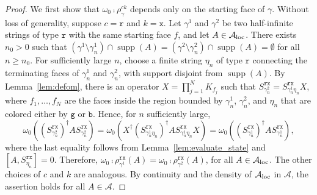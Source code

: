 \documentclass[a4paper,11pt]{article}
\theoremstyle{definition}
\theoremstyle{remark}
\theoremstyle{remark}
\begin{document}
\begin{proof}
    We first show that $\omega_0\comp\rho_\gamma^{ck}$ depends only on the starting face of $\gamma$. Without loss of generality, suppose $c=\mathtt{r}$ and $k=\mathtt{x}$. Let $\gamma^1$ and $\gamma^2$ be two half-infinite strings of type $\mathtt{r}$ with the same starting face $f$, and let $A\in\mathcal{A}_{\rm loc}$. There exists $n_0>0$ such that $(\gamma^1\setminus\gamma_n^1)\cap\operatorname{supp}(A) =  (\gamma^2\setminus\gamma_n^2)\cap\operatorname{supp}(A) = \emptyset$ for all $n\geq n_0$. For sufficiently large $n$, choose a finite string $\eta_n$ of type $\mathtt{r}$ connecting the terminating faces of $\gamma_n^1$ and $\gamma_n^2$, with support disjoint from $\operatorname{supp}(A)$. By Lemma~\ref{lem:defom}, there is an operator $X=\prod_{j=1}^N K_{f_j}$ such that $S_{\gamma_n^2}^{\mathtt{r}\mathtt{x}} = S_{\gamma_n^1\eta_n}^{\mathtt{r}\mathtt{x}}X$, where $f_1,\ldots,f_N$ are the faces inside the region bounded by $\gamma_n^1$, $\gamma_n^2$, and $\eta_n$ that are colored either by $\mathtt{g}$ or $\mathtt{b}$. Hence, for $n$ sufficiently large,
    \begin{equation*}
        \omega_0((S_{\gamma^2_n}^{\mathtt{r}\mathtt{x}})^\dagger AS_{\gamma^2_n}^{\mathtt{r}\mathtt{x}}) = \omega_0(X^\dagger(S_{\gamma^1_n\eta_n}^{\mathtt{r}\mathtt{x}})^\dagger AS_{\gamma^1_n\eta_n}^{\mathtt{r}\mathtt{x}}X) = \omega_0((S_{\gamma^1_n}^{\mathtt{r}\mathtt{x}})^\dagger AS_{\gamma^1_n}^{\mathtt{r}\mathtt{x}}),
    \end{equation*}
    where the last equality follows from Lemma~\ref{lem:evaluate_state} and $[A,S_{\eta_n}^{\mathtt{r}\mathtt{x}}]=0$. Therefore, $\omega_0\comp\rho_{\gamma^1}^{\mathtt{r}\mathtt{x}}(A) = \omega_0\comp\rho_{\gamma^2}^{\mathtt{r}\mathtt{x}}(A)$, for all $A\in\mathcal{A}_{\rm loc}$. The other choices of $c$ and $k$ are analogous. By continuity and the density of $\mathcal{A}_{\rm loc}$ in $\mathcal{A}$, the assertion holds for all $A\in\mathcal{A}$.


\end{proof}
\end{document}
